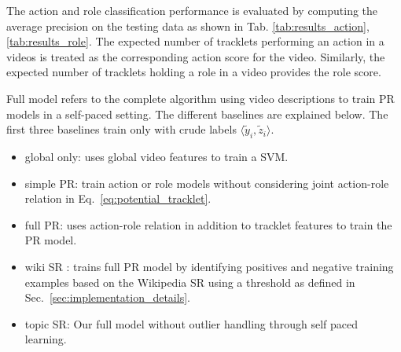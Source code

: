 \documentclass[10pt,twocolumn,letterpaper]{article}
\begin{document}
The action and role classification performance is evaluated by computing the average precision on the testing data as shown in Tab. \ref{tab:results_action}, \ref{tab:results_role}. The expected number of tracklets performing an action in a videos is treated as the corresponding action score for the video. Similarly, the expected number of tracklets holding a role in a video provides the role score. 

Full model refers to the complete algorithm using video descriptions to train
PR models in a self-paced setting. The different baselines are explained below.
The first three baselines train only with crude labels $\langle \tilde{y}_i, \tilde{z}_i \rangle$.

\vspace*{-5pt}
\begin{itemize}
 \item global only: uses global video features to train a SVM.\vspace*{-7pt}
 \item simple PR: train action or role models without considering joint action-role relation in Eq.~\ref{eq:potential_tracklet}.\vspace*{-7pt}
 \item full PR: uses action-role relation in addition to tracklet features to train the PR model.\vspace*{-7pt}
 \item wiki SR \cite{Rohrbach_CVPR10}: trains full PR model by identifying positives and negative training examples based on the Wikipedia SR using a threshold as defined in Sec.~\ref{sec:implementation_details}.\vspace*{-7pt}
 \item topic SR: Our full model without outlier handling through self paced learning. \vspace*{-3pt} 
\end{itemize}
\end{document}
